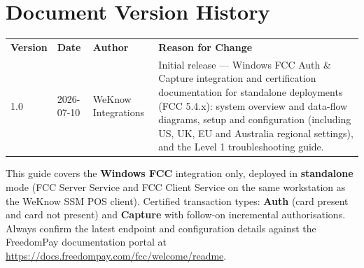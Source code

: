 \documentclass[a4paper,10pt]{article}
\begin{document}
\begin{titlepage}
\end{titlepage}

\section*{Document Version History}
\begin{center}
\renewcommand{\arraystretch}{1.35}
\begin{tabularx}{\textwidth}{L{16mm} L{24mm} L{34mm} X}
\color{white}\textbf{Version} &
\color{white}\textbf{Date} & \color{white}\textbf{Author} &
\color{white}\textbf{Reason for Change}\\
1.0 & 2026-07-10 & WeKnow Integrations &
Initial release --- Windows FCC Auth \& Capture integration and
certification documentation for standalone deployments (FCC 5.4.x):
system overview and data-flow diagrams, setup and configuration
(including US, UK, EU and Australia regional settings), and the
Level 1 troubleshooting guide.\\
\end{tabularx}
\end{center}

\begin{wkinfo}[Scope]
This guide covers the \textbf{Windows FCC} integration only, deployed in
\textbf{standalone} mode (FCC Server Service and FCC Client Service on the
same workstation as the WeKnow SSM POS client). Certified transaction
types: \textbf{Auth} (card present and card not present) and
\textbf{Capture} with follow-on incremental authorisations. Always confirm
the latest endpoint and configuration details against the FreedomPay
documentation portal at \url{https://docs.freedompay.com/fcc/welcome/readme}.
\end{wkinfo}
\end{document}

